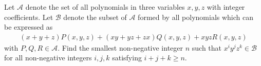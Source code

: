 Let $\mathcal{A}$ denote the set of all polynomials in three variables $x, y, z$ with integer coefficients. Let $\mathcal{B}$ denote the subset of $\mathcal{A}$ formed by all polynomials which can be expressed as
\begin{align*}
(x + y + z)P(x, y, z) + (xy + yz + zx)Q(x, y, z) + xyzR(x, y, z)
\end{align*}with $P, Q, R \in \mathcal{A}$.  Find the smallest non-negative integer $n$ such that $x^i y^j z^k \in \mathcal{B}$ for all non-negative integers $i, j, k$ satisfying $i + j + k \geq n$.